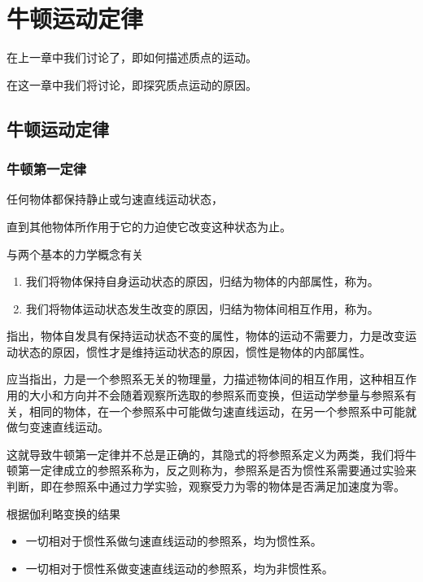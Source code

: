 \chapter{牛顿运动定律}

在上一章中我们讨论了，即如何描述质点的运动。

在这一章中我们将讨论，即探究质点运动的原因。

\section{牛顿运动定律}

\subsection{牛顿第一定律}
\begin{BoxPrinciple}[牛顿第一定律]
    任何物体都保持静止或匀速直线运动状态，

    直到其他物体所作用于它的力迫使它改变这种状态为止。
\end{BoxPrinciple}
与两个基本的力学概念有关
\begin{enumerate}
    \item 我们将物体保持自身运动状态的原因，归结为物体的内部属性，称为。
    \item 我们将物体运动状态发生改变的原因，归结为物体间相互作用，称为。
\end{enumerate}

指出，物体自发具有保持运动状态不变的属性，物体的运动不需要力，力是改变运动状态的原因，惯性才是维持运动状态的原因，惯性是物体的内部属性。

应当指出，力是一个参照系无关的物理量，力描述物体间的相互作用，这种相互作用的大小和方向并不会随着观察所选取的参照系而变换，但运动学参量与参照系有关，相同的物体，在一个参照系中可能做匀速直线运动，在另一个参照系中可能就做匀变速直线运动。

这就导致牛顿第一定律并不总是正确的，其隐式的将参照系定义为两类，我们将牛顿第一定律成立的参照系称为，反之则称为，参照系是否为惯性系需要通过实验来判断，即在参照系中通过力学实验，观察受力为零的物体是否满足加速度为零。

根据伽利略变换的结果
\begin{itemize}
    \item 一切相对于惯性系做匀速直线运动的参照系，均为惯性系。
    \item 一切相对于惯性系做变速直线运动的参照系，均为非惯性系。
\end{itemize}

